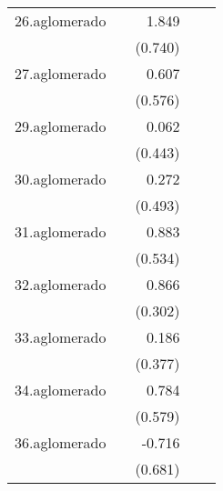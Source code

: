{\begin{longtable}{l*{4}{D{.}{.}{-1}}}
\addlinespace
26.aglomerado&                     &       1.849\sym{*}  &                     &                     \\
            &                     &     (0.740)         &                     &                     \\
\addlinespace
27.aglomerado&                     &       0.607         &                     &                     \\
            &                     &     (0.576)         &                     &                     \\
\addlinespace
29.aglomerado&                     &       0.062         &                     &                     \\
            &                     &     (0.443)         &                     &                     \\
\addlinespace
30.aglomerado&                     &       0.272         &                     &                     \\
            &                     &     (0.493)         &                     &                     \\
\addlinespace
31.aglomerado&                     &       0.883         &                     &                     \\
            &                     &     (0.534)         &                     &                     \\
\addlinespace
32.aglomerado&                     &       0.866\sym{**} &                     &                     \\
            &                     &     (0.302)         &                     &                     \\
\addlinespace
33.aglomerado&                     &       0.186         &                     &                     \\
            &                     &     (0.377)         &                     &                     \\
\addlinespace
34.aglomerado&                     &       0.784         &                     &                     \\
            &                     &     (0.579)         &                     &                     \\
\addlinespace
36.aglomerado&                     &      -0.716         &                     &                     \\
            &                     &     (0.681)         &                     &                     \\

\end{longtable}}
